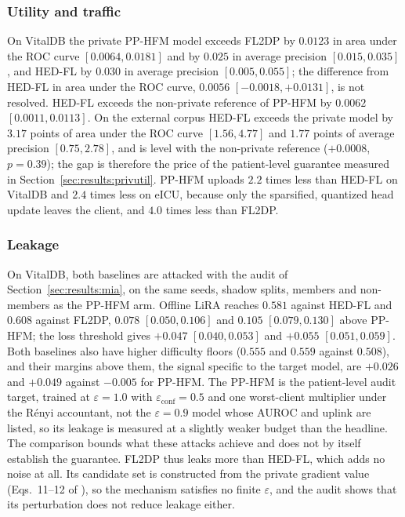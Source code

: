 \subsubsection{Utility and traffic}
On VitalDB the private PP-HFM model exceeds FL2DP by $0.0123$ in area under
the ROC curve $[0.0064, 0.0181]$ and by $0.025$ in average precision
$[0.015, 0.035]$, and HED-FL by $0.030$ in average precision
$[0.005, 0.055]$; the difference from HED-FL in area under the ROC curve,
$0.0056$ $[-0.0018, +0.0131]$, is not resolved. HED-FL exceeds the
non-private reference of PP-HFM by $0.0062$ $[0.0011, 0.0113]$. On the
external corpus HED-FL exceeds the private model by $3.17$ points of area
under the ROC curve $[1.56, 4.77]$ and $1.77$ points of average precision
$[0.75, 2.78]$, and is level with the non-private reference ($+0.0008$,
$p = 0.39$); the gap is therefore the price of the patient-level guarantee
measured in Section~\ref{sec:results:privutil}. PP-HFM uploads $2.2$ times
less than HED-FL on VitalDB and $2.4$ times less on eICU, because only the
sparsified, quantized head update leaves the client, and $4.0$ times less than
FL2DP.

\subsubsection{Leakage}
On VitalDB, both baselines are attacked with the audit of Section~\ref{sec:results:mia},
on the same seeds, shadow splits, members and non-members as the PP-HFM arm.
Offline LiRA reaches $0.581$ against HED-FL and $0.608$ against FL2DP,
$0.078$ $[0.050, 0.106]$ and $0.105$ $[0.079, 0.130]$ above PP-HFM; the loss
threshold gives $+0.047$ $[0.040, 0.053]$ and $+0.055$ $[0.051, 0.059]$. Both
baselines also have higher difficulty floors ($0.555$ and $0.559$ against
$0.508$), and their margins above them, the signal specific to the target
model, are $+0.026$ and $+0.049$ against $-0.005$ for PP-HFM. The PP-HFM is the patient-level audit target, trained at $\varepsilon = 1.0$ with $\varepsilon_{\mathrm{conf}} = 0.5$ and one worst-client multiplier under the R\'enyi accountant, not the $\varepsilon = 0.9$ model whose AUROC and uplink are listed, so its leakage is measured at a slightly weaker budget than the headline. The comparison bounds what these attacks achieve and does not by itself establish the guarantee. FL2DP thus leaks more than HED-FL,
which adds no noise at all. Its candidate set is constructed from the private
gradient value (Eqs.~11--12 of \cite{ref9}), so the mechanism satisfies no
finite $\varepsilon$, and the audit shows that its perturbation does not
reduce leakage either.


